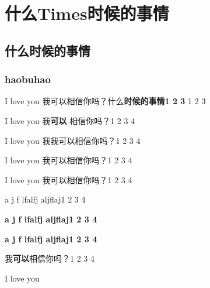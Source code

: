 \section{什么Times时候的事情}
\subsection{什么时候的事情}
\subsubsection{haobuhao}

I love you 我可以相信你吗？{\heiti{}什么\bfseries 时候的事情1 2 3} 1 2 3\par
I love you 我\textbf{可以} 相信你吗？1 2 3 4\par
{\enkai  I love you 我我可以相信你吗？1 2 3 4}\par
{\enhwxk\zhhwxk I love you 我可以相信你吗？1 2 3 4}\par
{\zhyahei I love you 我可以相信你吗？1 2 3 4}\par
{\enhei {} a  j f lfalfj aljflaj1 2 3 4}\par
{\sffamily{} \bfseries a  j f lfalfj aljflaj1 2 3 4}\par
{\bfseries{} a  j f lfalfj aljflaj1 2 3 4}\par
{\zhkaiti {}我\textbf{可以}相信你吗？1 2 3 4}\par

I love you